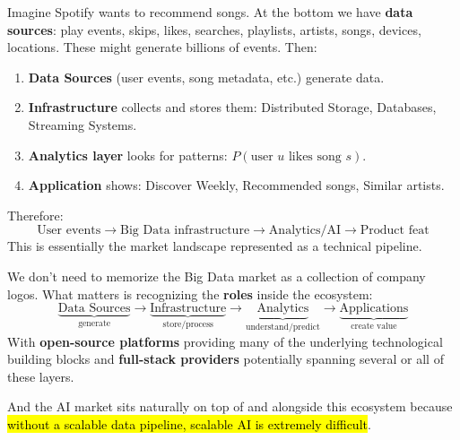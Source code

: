 \highspace
\begin{examplebox}
    Imagine Spotify wants to recommend songs. At the bottom we have \textbf{data sources}: play events, skips, likes, searches, playlists, artists, songs, devices, locations. These might generate billions of events. Then:
    \begin{enumerate}
        \item \textbf{Data Sources} (user events, song metadata, etc.) generate data.
        \item \textbf{Infrastructure} collects and stores them: Distributed Storage, Databases, Streaming Systems.
        \item \textbf{Analytics layer} looks for patterns: $P(\text{user }u\text{ likes song }s)$.
        \item \textbf{Application} shows: Discover Weekly, Recommended songs, Similar artists.
    \end{enumerate}
    Therefore:
    \begin{equation*}
        \text{User events}
        \to
        \text{Big Data infrastructure}
        \to
        \text{Analytics/AI}
        \to
        \text{Product feat}
    \end{equation*}
    This is essentially the market landscape represented as a technical pipeline.
\end{examplebox}

\highspace
\begin{takeawaysbox}
    We don't need to memorize the Big Data market as a collection of company logos. What matters is recognizing the \textbf{roles} inside the ecosystem:
    \begin{equation*}
        \underbrace{\text{Data Sources}}_{\text{generate}}
        \rightarrow
        \underbrace{\text{Infrastructure}}_{\text{store/process}}
        \rightarrow
        \underbrace{\text{Analytics}}_{\text{understand/predict}}
        \rightarrow
        \underbrace{\text{Applications}}_{\text{create value}}
    \end{equation*}
    With \textbf{open-source platforms} providing many of the underlying technological building blocks and \textbf{full-stack providers} potentially spanning several or all of these layers.

    \highspace
    And the AI market sits naturally on top of and alongside this ecosystem because \hl{without a scalable data pipeline, scalable AI is extremely difficult}.
\end{takeawaysbox}
